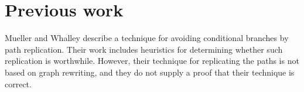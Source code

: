 \section{Previous work}

Mueller and Whalley \cite{Mueller:1995:ACB:207110.207116} describe a
technique for avoiding conditional branches by path replication.
Their work includes heuristics for determining whether such
replication is worthwhile.  However, their technique for replicating
the paths is not based on graph rewriting, and they do not supply a
proof that their technique is correct.
